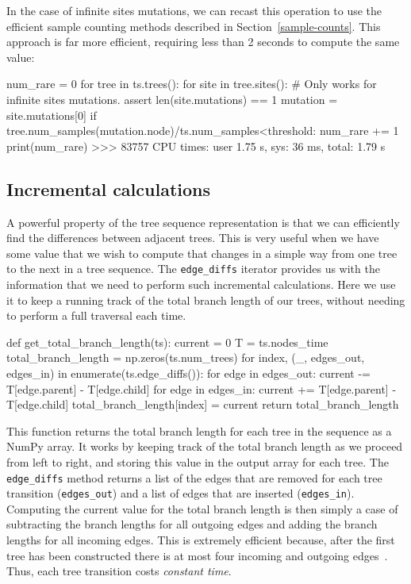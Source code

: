 \documentclass[graybox]{svmult}
\begin{document}
In the case of infinite sites mutations, we can recast this operation
to use the efficient sample counting methods described in
Section~\ref{sample-counts}. This approach is far more
efficient, requiring less than 2 seconds to compute the same value:
\begin{pythoncode}
num_rare = 0
for tree in ts.trees():
  for site in tree.sites():
    # Only works for infinite sites mutations.
    assert len(site.mutations) == 1
    mutation = site.mutations[0]
    if tree.num_samples(mutation.node)/ts.num_samples<threshold:
        num_rare += 1
print(num_rare)
>>> 83757
CPU times: user 1.75 s, sys: 36 ms, total: 1.79 s
\end{pythoncode}

\subsection{Incremental calculations}\label{incremental-calculations}

A powerful property of the tree sequence representation is that we can
efficiently find the differences between adjacent trees. This is very
useful when we have some value that we wish to compute that changes in a
simple way from one tree to the next in a tree sequence. 
The \texttt{edge\_diffs} iterator provides us
with the information that we need to perform such incremental
calculations. Here we use it to keep a running track of the total branch
length of our trees, without needing to perform a full traversal each
time.

\begin{pythoncode}
def get_total_branch_length(ts):
    current = 0
    T = ts.nodes_time
    total_branch_length = np.zeros(ts.num_trees)
    for index, (_, edges_out, edges_in) in enumerate(ts.edge_diffs()):
        for edge in edges_out:
            current -= T[edge.parent] - T[edge.child]
        for edge in edges_in:
            current += T[edge.parent] - T[edge.child]
        total_branch_length[index] = current
    return total_branch_length
\end{pythoncode}

    This function returns the total branch length for each tree in the
sequence as a NumPy array. It works by keeping track of the total branch
length as we proceed from left to right, and storing this value in the
output array for each tree. The \texttt{edge\_diffs} method returns a
list of the edges that are removed for each tree transition
(\texttt{edges\_out}) and a list of edges that are inserted
(\texttt{edges\_in}). Computing the current value for the total branch
length is then simply a case of subtracting the branch lengths for all
outgoing edges and adding the branch lengths for all incoming edges.
This is extremely efficient because, after the first tree has been
constructed there is at most four incoming and outgoing
edges~\citep{kelleher2016efficient}. Thus,
each tree transition costs \emph{constant time}.
\end{document}
